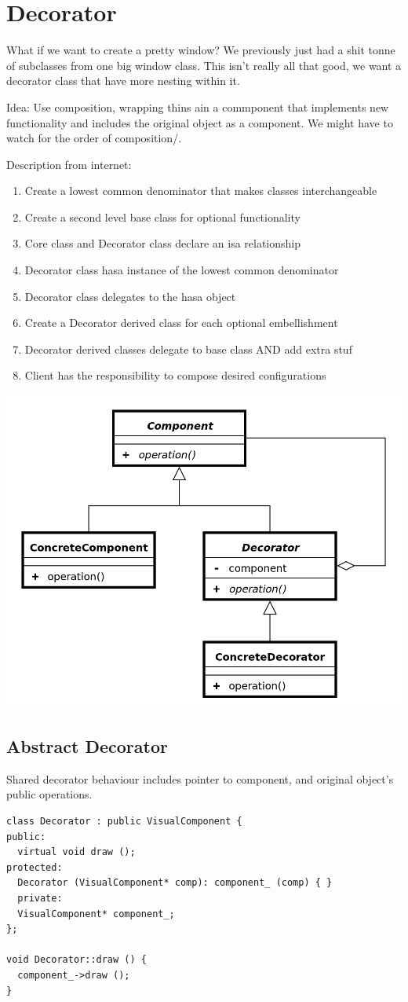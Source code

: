 \documentclass[12pt]{article}
\begin{document}
\section*{Decorator}
What if we want to create a pretty window? We previously just had a shit tonne of subclasses from one big window class. This isn't really all that good, we want a decorator class that have more nesting within it.

Idea: Use composition, wrapping thins ain a commponent that implements new functionality and includes the original object as a component. We might have to watch for the order of composition/.

Description from internet:
\begin{enumerate}
\item Create a lowest common denominator that makes classes interchangeable
\item Create a second level base class for optional functionality
\item Core class and Decorator class declare an isa relationship
\item Decorator class hasa instance of the lowest common denominator
\item Decorator class delegates to the hasa object
\item Create a Decorator derived class for each optional embellishment
\item Decorator derived classes delegate to base class AND add extra stuf
\item Client has the responsibility to compose desired configurations
\end{enumerate}
\begin{center}
\includegraphics[width=12pt0cm]{Decorator_UML.png}
\end{center}

\subsection*{Abstract Decorator}
Shared decorator behaviour includes pointer to component, and original object's public operations.

\begin{lstlisting}
class Decorator : public VisualComponent {
public:
  virtual void draw ();
protected:
  Decorator (VisualComponent* comp): component_ (comp) { }
  private:
  VisualComponent* component_;
};

void Decorator::draw () {
  component_->draw ();
}
\end{lstlisting}
\end{document}
